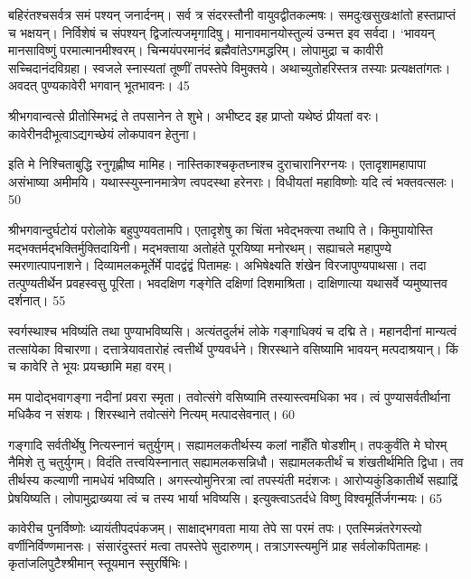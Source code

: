   बहिरंतश्चसर्वत्र समं पश्यन् जनार्दनम्।
 सर्व त्र संदरस्तौनी वायुवद्वीतकल्मषः।
 समदुःखसुखःक्षांतो हस्तप्राप्तं च भक्षयन्।
 निर्विशेषं च संपश्यन् द्विजांत्यजमृगादिषु।
 मानावमानयोस्तुल्यं उन्मत्त इव सर्वदा।
 ‘भावयन् मानसाविष्णुं परमात्मानमीश्वरम्।
 चिन्मयंपरमानंदं ब्रह्मैवांतेऽगमद्धरिम्।
 लोपामुद्रा च कावीरी सच्चिदानंदविग्रहा।
 स्वजले स्नास्यतां तूष्णीं तपस्तेपे विमुक्तये।
 अथाच्युतोहरिस्तत्र तस्याः प्रत्यक्षतांगतः।
 अवदत् पुण्यकावेरी भगवान् भूतभावनः।
 45

  श्रीभगवान्वत्से प्रीतोस्मिभद्रं ते तपसानेन ते शुभे।
 अभीष्टद इह प्राप्तो यथेष्ठं प्रीयतां वरः।
 कावेरीनदीभूत्वाऽद्यगच्छेयं लोकपावन हेतुना।
 
इति मे निश्चिताबुद्धि रनुगृह्णीष्व मामिह।
 नास्तिकाश्चकृतघ्नाश्च दुराचारानिरग्नयः।
 एतादृशामहापापा असंभाष्या अमीमयि।
 यथास्स्युस्नानमात्रेण त्वपदस्था हरेनराः।
 विधीयतां महाविष्णोः यदि त्वं भक्तवत्सलः।
 50

  श्रीभगवान्दुर्घटोयं परोलोके बहुपुण्यवतामपि।
 एतादृशेषु का चिंता भवेद्भक्त्या तथापि ते।
 किमुपायोस्ति मद्भक्तर्मद्भक्तिर्मुक्तिदायिनी।
 मद्भक्ताया अतोहंते पूरयिष्या मनोरथम्।
 सह्याचले महापुण्ये स्मरणात्पापनाशने।
 दिव्यामलकमूर्तेर्मे पादद्वंद्वं पितामहः।
 अभिषेक्ष्यति शंखेन विरजापुण्यपाथसा।
 तदा तत्पुण्यतीर्थेन प्रवहस्वसु पूरिता।
 भवदक्षिण गङ्गेति दक्षिणां दिशमाश्रिता।
 दाक्षिणात्या यथासर्वे प्यमुष्यात्तव दर्शनात्।
 55

  स्वर्गस्थाश्च भविष्यंति तथा पुण्याभविष्यसि।
 अत्यंतदुर्लभं लोके गङ्गाधिक्यं च दद्मि ते।
 महानदीनां मान्यत्वं तत्सांयेका विचारणा।
 दत्तात्रेयावतारोहं त्वत्तीर्थे पुण्यवर्धने।
 शिरस्थाने वसिष्यामि भावयन् मत्पदाश्रयान्।
 किं च कावेरि ते भूयः प्रयच्छामि महा वरम्।
 
मम पादोद्भवागङ्गा नदीनां प्रवरा स्मृता।
 तवोत्संगे वसिष्यामि तस्यास्त्वमधिका भव।
 त्वं पुण्यासर्वतीर्थाना मधिकैव न संशयः।
 शिरस्थाने तवोत्संगे नित्यम् मत्पादसेवनात्।
 60

  गङ्गादि सर्वतीर्थेषु नित्यस्नानं चतुर्युगम्।
 सह्यामलकतीर्थस्य कलां नाहँति षोडशीम्।
 तपःकुर्वंति मे घोरम् नैमिशे तु चतुर्युगम्।
 विदंति तत्त्वयिस्नानात् सह्यामलकसन्निधौ।
 सह्यामलकतीर्थं च शंखतीर्थमिति द्विधा।
 तव तीर्थस्य कल्याणी नामधेयं भविष्यति।
 अगस्त्योमुनिरत्रा त्वां तपस्यंती मदंशजः।
 आरोप्यकुंडिकातीर्थे सह्याद्रिं प्रेषयिष्यति।
 लोपामुद्राख्यया त्वं च तस्य भार्या भविष्यसि।
 इत्युक्त्वाऽतर्दधे विष्णु विश्वमूर्तिर्जगन्मयः।
 65

  कावेरीच पुनर्विष्णोः ध्यायंतीपदपंकजम्।
 साक्षाद्भगवता माया तेपे सा परमं तपः।
 एतस्मिन्नंतरेगस्त्यो वर्णीनिर्विण्णमानसः।
 संसारंदुस्तरं मत्वा तपस्तेपे सुदारुणम्।
 तत्राऽगस्त्यमुनिं प्राह सर्वलोकपितामहः।
 कृतांजलिपुटैश्श्रीमान् स्तूयमान स्सुरर्षिभिः।
 
